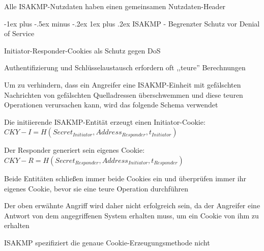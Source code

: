 \documentclass[a4paper]{article}
\makeatletter
\renewcommand{\subsubsection}{\@startsection{subsubsection}{3}{0mm}%
 {-1ex plus -.5ex minus -.2ex}%
 {1ex plus .2ex}%
 {\normalfont\small\bfseries}}
\makeatother
\begin{document}
\begin{multicols}{3}
\begin{itemize*}
\begin{itemize*}
                  \item Alle ISAKMP-Nutzdaten haben einen gemeinsamen Nutzdaten-Header
            \end{itemize*}
      \end{itemize*}

      \subsubsection{ISAKMP - Begrenzter Schutz vor Denial of Service}
      \begin{itemize*}
            \item Initiator-Responder-Cookies als Schutz gegen DoS
            \item Authentifizierung und Schlüsselaustausch erfordern oft ,,teure'' Berechnungen%
            \item Um zu verhindern, dass ein Angreifer eine ISAKMP-Einheit mit gefälschten Nachrichten von gefälschten Quelladressen überschwemmen und diese teuren Operationen verursachen kann, wird das folgende Schema verwendet
            \item Die initiierende ISAKMP-Entität erzeugt einen Initiator-Cookie: $CKY-I = H(Secret_{Initiator}, Address_{Responder}, t_{Initiator})$
            \item Der Responder generiert sein eigenes Cookie: $CKY-R = H(Secret_{Responder}, Address_{Initiator}, t_{Responder})$
            \item Beide Entitäten schließen immer beide Cookies ein und überprüfen immer ihr eigenes Cookie, bevor sie eine teure Operation durchführen
            \item Der oben erwähnte Angriff wird daher nicht erfolgreich sein, da der Angreifer eine Antwort von dem angegriffenen System erhalten muss, um ein Cookie von ihm zu erhalten
            \item ISAKMP spezifiziert die genaue Cookie-Erzeugungsmethode nicht
      \end{itemize*}


\end{multicols}
\end{document}
